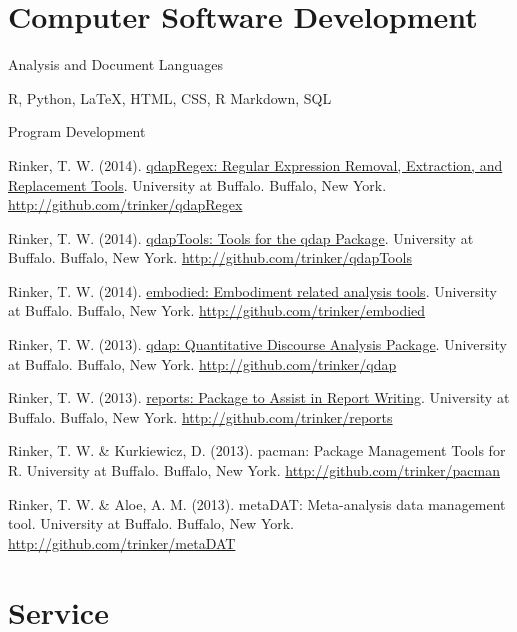 \section{Computer Software Development}
Analysis and Document Languages
%
\begin{innerlist}
    \item R, Python, \LaTeX, HTML, CSS, R Markdown, SQL
\end{innerlist}

\halfblankline

Program Development
\begin{innerlist}
    \item Rinker, T. W. (2014). \href{http://cran.r-project.org/web/packages/qdapRegex/index.html}{qdapRegex: Regular Expression Removal, Extraction, and Replacement Tools}. University at Buffalo. Buffalo, New York.\\ \url{http://github.com/trinker/qdapRegex}
    \item Rinker, T. W. (2014). \href{http://cran.r-project.org/web/packages/qdapTools/index.html}{qdapTools: Tools for the qdap Package}. University at Buffalo. Buffalo, New York. \url{http://github.com/trinker/qdapTools}
    \item Rinker, T. W. (2014). \href{http://github.com/trinker/embodied}{embodied: Embodiment related analysis tools}.  University at Buffalo. Buffalo, New York. \url{http://github.com/trinker/embodied}
    \item Rinker, T. W. (2013). \href{http://cran.r-project.org/web/packages/qdap/index.html}{qdap: Quantitative Discourse Analysis Package}. University at Buffalo. Buffalo, New York. \url{http://github.com/trinker/qdap}
    \item Rinker, T. W. (2013). \href{http://cran.r-project.org/web/packages/reports/index.html}{reports: Package to Assist in Report Writing}. University at Buffalo. Buffalo, New York. \url{http://github.com/trinker/reports}
    \item Rinker, T. W. \& Kurkiewicz, D. (2013). pacman: Package Management Tools for R. University at Buffalo. Buffalo, New York. \url{http://github.com/trinker/pacman}
    \item Rinker, T. W. \& Aloe, A. M. (2013). metaDAT: Meta-analysis data management tool.  University at Buffalo. Buffalo, New York. \\ \url{http://github.com/trinker/metaDAT}
\end{innerlist}

\section{Service}

